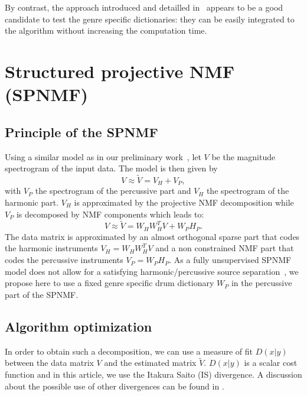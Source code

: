 \documentclass{article}
\begin{document}
By contrast, the approach introduced and detailled in~\cite{laroche2015structured,larocheJournal} appears to be a good candidate to test the genre specific dictionaries: they can be easily integrated to the algorithm without increasing the computation time. %



\section{Structured projective NMF (SPNMF)}
\label{sec:SPNMF}


\subsection{Principle of the SPNMF}

Using a similar model as in our preliminary work~\cite{laroche2015structured}, let $V$ be the magnitude spectrogram of the input data. The model is then given by
\begin{equation} \label{Cfunction}
V \approx \tilde{V}= V_H + V_{P},
\end{equation}
with $V_P$ the spectrogram of the percussive part and $V_H$ the spectrogram of the harmonic part. $V_H$ is approximated by the projective NMF decomposition \cite{yuanOja2005} while $V_P$ is decomposed by NMF components which leads to:
\begin{equation}
V \approx \tilde{V}= W_{H}W_{H}^{T}V + W_{P} H_{P}.
\end{equation}
The data matrix is approximated by an almost orthogonal sparse part that codes the harmonic instruments $V_H = W_HW_H^T V$ and a non constrained NMF part that codes the percussive instruments $V_P = W_PH_P$. As a fully unsupervised SPNMF model does not allow for a satisfying harmonic/percussive source separation~\cite{laroche2015structured}, we propose here to use a fixed genre specific drum dictionary $W_P$ in the percussive part of the SPNMF.



\subsection{Algorithm optimization}

In order to obtain such a decomposition, we can use a measure of fit $D(x|y)$ between the data matrix $V$ and the estimated matrix $\tilde{V}$. $D(x|y)$ is a scalar cost function and in this article, we use the Itakura Saito (IS) divergence. A discussion about the possible use of other divergences can be found in \cite{larocheJournal}.
\end{document}
